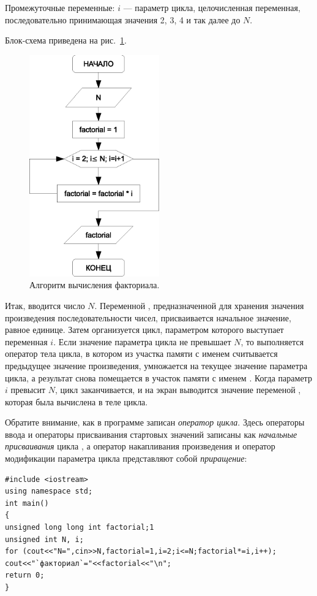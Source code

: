 Промежуточные переменные: $i$ --- параметр цикла, целочисленная переменная, последовательно принимающая
значения 2, 3, 4 и так далее до $N$.

Блок-схема приведена на рис.~\ref{ch03:refDrawing28}.
\begin{figure}[htb]
\begin{center}
\includegraphics[width=0.5\textwidth]{img/ris_3_29}
\caption{Алгоритм вычисления факториала.}
\label{ch03:refDrawing28}
\end{center}
\end{figure}


Итак, вводится число $N$. Переменной , предназначенной для хранения
значения произведения последовательности чисел, присваивается начальное значение, равное единице. Затем организуется
цикл, параметром которого выступает переменная $i$. Если значение параметра цикла не превышает
$N$, то выполняется оператор тела цикла, в котором из участка памяти с именем
 считывается предыдущее значение произведения, умножается на текущее значение параметра
цикла, а результат снова помещается в участок памяти с именем . Когда параметр
$i$ превысит $N$, цикл заканчивается, и на экран выводится значение переменой
, которая была вычислена в теле цикла.

Обратите внимание, как в программе записан \emph{оператор цикла}. Здесь операторы ввода и операторы
присваивания стартовых значений записаны как \emph{начальные присваивания} цикла , а
оператор накапливания произведения и оператор модификации параметра цикла представляют собой
\emph{приращение}:
\begin{lstlisting}
#include <iostream>
using namespace std;
int main()
{
unsigned long long int factorial;1
unsigned int N, i;
for (cout<<"N=",cin>>N,factorial=1,i=2;i<=N;factorial*=i,i++);
cout<<"`факториал`="<<factorial<<"\n";
return 0;
}
\end{lstlisting}

